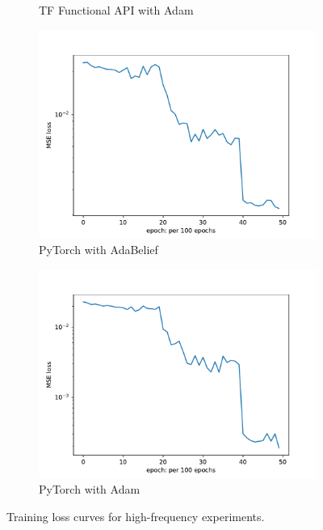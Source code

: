\documentclass[10pt,journal,compsoc,onecolumn]{IEEEtran}
\begin{document}
\begin{figure}[htbp]
\begin{subfigure}[b]{0.45\textwidth}
        \caption{TF Functional API with Adam}
    \end{subfigure}
    \begin{subfigure}[b]{0.45\textwidth}
        \includegraphics[width=\textwidth]{../../results/pytorch/high-frequency-adabelief-20250206-1607-4/loss}
        \caption{PyTorch with AdaBelief}
    \end{subfigure}
    \begin{subfigure}[b]{0.45\textwidth}
        \includegraphics[width=\textwidth]{../../results/pytorch/high-frequency-adam-20250206-1607-5/loss}
        \caption{PyTorch with Adam}
    \end{subfigure}
    \caption{Training loss curves for high-frequency experiments.}
    \label{fig:results_high}
\end{figure}
\end{document}
